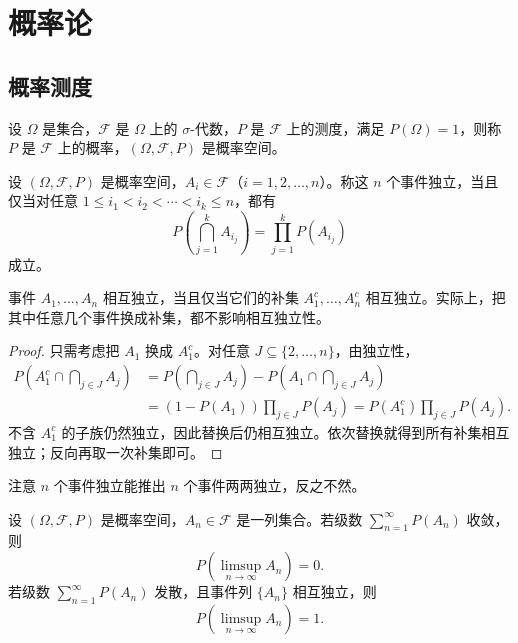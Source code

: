 \chapter{概率论}
\section{概率测度}

\begin{definition}[概率空间]\label{def:probability-space}
设 $\Omega$ 是集合，$\mathcal F$ 是 $\Omega$ 上的 $\sigma$-代数，$P$ 是 $\mathcal F$ 上的测度，满足 $P(\Omega)=1$，则称 $P$ 是 $\mathcal F$ 上的概率，$(\Omega,\mathcal F,P)$ 是概率空间。
\end{definition}

\begin{definition}[独立性]\label{def:event-independence}
设 $(\Omega,\mathcal F,P)$ 是概率空间，$A_i\in\mathcal F$（$i=1,2,\ldots,n$）。称这 $n$ 个事件独立，当且仅当对任意 $1\leq i_1<i_2<\cdots<i_k\leq n$，都有
\[
P\left(\bigcap_{j=1}^k A_{i_j}\right)=\prod_{j=1}^kP(A_{i_j})
\]
成立。
\end{definition}
\begin{proposition}\label{prop:independence-complements}
事件 $A_1,\ldots,A_n$ 相互独立，当且仅当它们的补集 $A_1^c,\ldots,A_n^c$ 相互独立。实际上，把其中任意几个事件换成补集，都不影响相互独立性。
\end{proposition}
\begin{proof}
只需考虑把 $A_1$ 换成 $A_1^c$。对任意 $J\subseteq\{2,\ldots,n\}$，由独立性，
\[
\begin{aligned}
P\left(A_1^c\cap\bigcap_{j\in J}A_j\right)
&=P\left(\bigcap_{j\in J}A_j\right)-P\left(A_1\cap\bigcap_{j\in J}A_j\right)\\
&=(1-P(A_1))\prod_{j\in J}P(A_j)
=P(A_1^c)\prod_{j\in J}P(A_j).
\end{aligned}
\]
不含 $A_1^c$ 的子族仍然独立，因此替换后仍相互独立。依次替换就得到所有补集相互独立；反向再取一次补集即可。
\end{proof}

\begin{remark}

注意 $n$ 个事件独立能推出 $n$ 个事件两两独立，反之不然。
\end{remark}

\begin{theorem}\label{thm:borel-cantelli}
设 $(\Omega,\mathcal F,P)$ 是概率空间，$A_n\in\mathcal F$ 是一列集合。若级数 $\sum_{n=1}^{\infty}P(A_n)$ 收敛，则
\[
P\left(\limsup_{n\to\infty}A_n\right)=0.
\]
若级数 $\sum_{n=1}^{\infty}P(A_n)$ 发散，且事件列 $\{A_n\}$ 相互独立，则
\[
P\left(\limsup_{n\to\infty}A_n\right)=1.
\]
\end{theorem}

